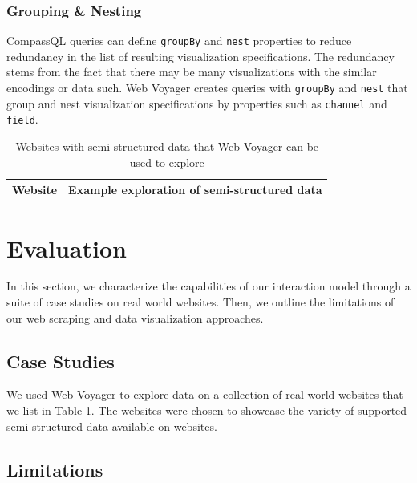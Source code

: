 \documentclass[sigconf,screen]{acmart}
\begin{document}
\hypertarget{grouping-nesting}{%
\subsubsection{Grouping \& Nesting}\label{grouping-nesting}}

CompassQL queries can define \texttt{groupBy} and \texttt{nest}
properties to reduce redundancy in the list of resulting visualization
specifications. The redundancy stems from the fact that there may be
many visualizations with the similar encodings or data such. Web Voyager
creates queries with \texttt{groupBy} and \texttt{nest} that group and
nest visualization specifications by properties such as \texttt{channel}
and \texttt{field}.

\begin{table}[]
\centering
\begin{tabular}{|l|l|}
\hline
\textbf{Website}              & \textbf{Example exploration of semi-structured data}                                        \\ \hline
\end{tabular}
\vspace{8pt}
\caption{Websites with semi-structured data that Web Voyager can be used to explore}
\end{table}

\hypertarget{sec:evaluation}{%
\section{Evaluation}\label{sec:evaluation}}

In this section, we characterize the capabilities of our interaction
model through a suite of case studies on real world websites. Then, we
outline the limitations of our web scraping and data visualization
approaches.

\hypertarget{case-studies}{%
\subsection{Case Studies}\label{case-studies}}

We used Web Voyager to explore data on a collection of real world
websites that we list in Table 1. The websites were chosen to showcase
the variety of supported semi-structured data available on websites.

\hypertarget{limitations}{%
\subsection{Limitations}\label{limitations}}
\end{document}
